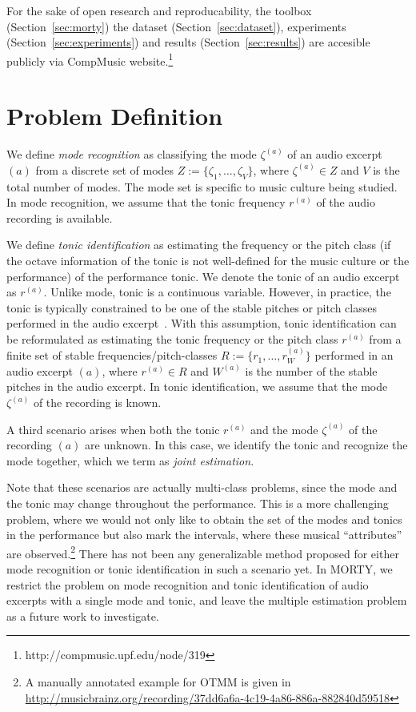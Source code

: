 \documentclass{sig-alternate}
\begin{document}
For the sake of open research and reproducability, the toolbox (Section~\ref{sec:morty}) the dataset (Section~\ref{sec:dataset}), experiments (Section~\ref{sec:experiments}) and results (Section~\ref{sec:results}) are accesible publicly via CompMusic website.\footnote{http://compmusic.upf.edu/node/319}

\section{Problem Definition}\label{sec:problem}
We define \emph{mode recognition} as classifying the mode $\zeta^{(a)}$ of an audio excerpt $(a)$ from a discrete set of modes $Z := \{\zeta_1, \dots, \zeta_V\}$, where $\zeta^{(a)} \in Z$ and $V$ is the total number of modes. The mode set is specific to music culture being studied. In mode recognition, we assume that the tonic frequency $r^{(a)}$ of the audio recording is available.

We define \emph{tonic identification} as estimating the frequency or the pitch class (if the octave information of the tonic is not well-defined for the music culture or the performance) of the performance tonic. We denote the tonic of an audio excerpt as $r^{(a)}$. Unlike mode, tonic is a continuous variable. However, in practice, the tonic is typically constrained to be one of the stable pitches or pitch classes performed in the audio excerpt~\cite{chordia,bozkurt_makam}. With this assumption, tonic identification can be reformulated as estimating the tonic frequency or the pitch class $r^{(a)}$ from a finite set of stable frequencies/pitch-classes $R := \{r_1, \dots, r_W^{(a)}\}$ performed in an audio excerpt $(a)$, where $r^{(a)} \in R$ and $W^{(a)}$ is the number of the stable pitches in the audio excerpt. In tonic identification, we assume that the mode $\zeta^{(a)}$ of the recording is known. 

A third scenario arises when both the tonic $r^{(a)}$ and the mode $\zeta^{(a)}$ of the recording $(a)$ are unknown. In this case, we identify the tonic and recognize the mode together, which we term as \emph{joint estimation}.

Note that these scenarios are actually multi-class problems, since the mode and the tonic may change throughout the performance. This is a more challenging problem, where we would not only like to obtain the set of the modes and tonics in the performance but also mark the intervals, where these musical ``attributes'' are observed.\footnote{A manually annotated example for OTMM is given in \url{http://musicbrainz.org/recording/37dd6a6a-4c19-4a86-886a-882840d59518}} There has not been any generalizable method proposed for either mode recognition or tonic identification in such a scenario yet. In MORTY, we restrict the problem on mode recognition and tonic identification of audio excerpts with a single mode and tonic, and leave the multiple estimation problem as a future work to investigate.
\end{document}
